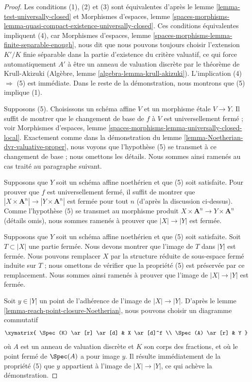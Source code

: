 \begin{proof}
Les conditions (1), (2) et (3) sont équivalentes d'après
le lemme \ref{lemma-test-universally-closed} et
Morphismes d'espaces, lemme
\ref{spaces-morphisms-lemma-quasi-compact-existence-universally-closed}.
Ces conditions équivalentes impliquent (4), car
Morphismes d'espaces, lemme \ref{spaces-morphisms-lemma-finite-separable-enough},
nous dit que nous pouvons toujours choisir l'extension $K'/K$ finie séparable dans
la partie d'existence du critère valuatif, ce qui force automatiquement
$A'$ à être un anneau de valuation discrète par le théorème de Krull-Akizuki
(Algèbre, lemme \ref{algebra-lemma-krull-akizuki}).
L'implication (4) $\Rightarrow$ (5) est immédiate.
Dans le reste de la démonstration, nous montrons que (5) implique (1).

\medskip\noindent
Supposons (5). Choisissons un schéma affine $V$ et un morphisme \'etale $V \to Y$.
Il suffit de montrer que le changement de base de $f$ à $V$ est universellement fermé ;
voir Morphismes d'espaces, lemme
\ref{spaces-morphisms-lemma-universally-closed-local}.
Exactement comme dans la démonstration du lemme \ref{lemma-Noetherian-dvr-valuative-proper},
nous voyons que l'hypothèse (5) se transmet à ce changement de base ; nous omettons
les détails. Nous sommes ainsi ramenés au cas traité au paragraphe suivant.

\medskip\noindent
Supposons que $Y$ soit un schéma affine noethérien et que (5) soit satisfaite.
Pour prouver que $f$ est universellement fermé, il suffit de montrer que
$|X \times \mathbf{A}^n| \to |Y \times \mathbf{A}^n|$ est fermée
pour tout $n$ (d'après la discussion ci-dessus). Comme l'hypothèse (5)
se transmet au morphisme produit
$X \times \mathbf{A}^n \to Y \times \mathbf{A}^n$ (détails omis),
nous sommes ramenés à prouver que $|X| \to |Y|$ est fermée.

\medskip\noindent
Supposons que $Y$ soit un schéma affine noethérien et que (5) soit satisfaite.
Soit $T \subset |X|$ une partie fermée. Nous devons montrer que
l'image de $T$ dans $|Y|$ est fermée. Nous pouvons remplacer $X$
par la structure réduite de sous-espace fermé induite sur $T$ ; nous
omettons de vérifier que la propriété (5) est préservée par
ce remplacement. Nous sommes ainsi ramenés à prouver que l'image
de $|X| \to |Y|$ est fermée.

\medskip\noindent
Soit $y \in |Y|$ un point de l'adhérence de l'image de
$|X| \to |Y|$. D'après le lemme \ref{lemma-reach-point-closure-Noetherian},
nous pouvons choisir un diagramme commutatif
$$
\xymatrix{
\Spec(K) \ar[r] \ar[d] & X \ar[d]^f \\
\Spec(A) \ar[r] & Y
}
$$
où $A$ est un anneau de valuation discrète et $K$ son corps des fractions,
et où le point fermé de $\Spec(A)$ a pour image $y$. Il résulte immédiatement
de la propriété (5) que $y$ appartient à l'image de
$|X| \to |Y|$, ce qui achève la démonstration.
\end{proof}


















